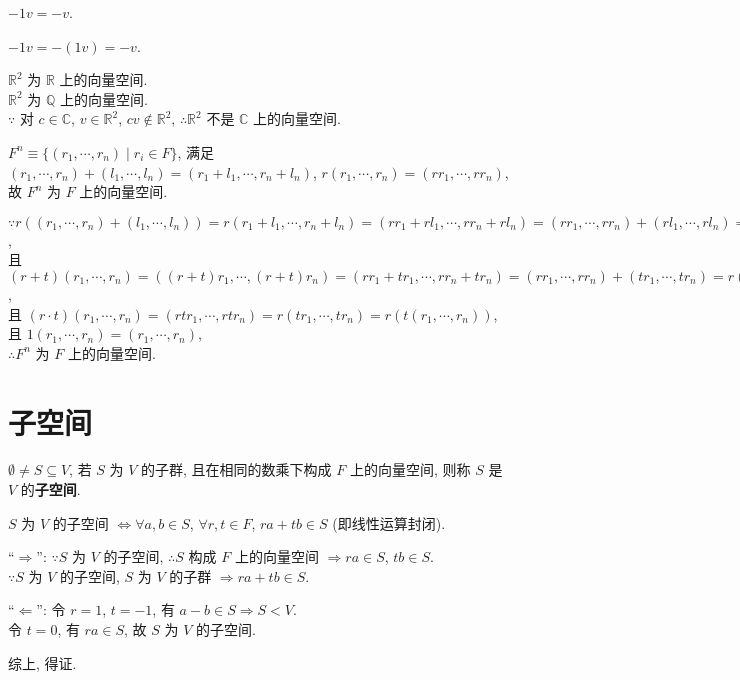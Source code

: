 \documentclass{note}
\begin{document}
$-1v=-v$.
\begin{pf}
    $-1v=-(1v)=-v$.
\end{pf}

\begin{eg}
    $\mathbb{R}^2$ 为 $\mathbb{R}$ 上的向量空间.\\
    $\mathbb{R}^2$ 为 $\mathbb{Q}$ 上的向量空间.\\
    $\because$ 对 $c\in\mathbb{C}$, $v\in\mathbb{R}^2$, $cv\notin\mathbb{R}^2$, $\therefore\mathbb{R}^2$ 不是 $\mathbb{C}$ 上的向量空间.
\end{eg}

\begin{eg}
    $F^n\equiv\{(r_1,\cdots,r_n)\mid r_i\in F\}$, 满足 $(r_1,\cdots,r_n)+(l_1,\cdots,l_n)=(r_1+l_1,\cdots,r_n+l_n)$, $r(r_1,\cdots,r_n)=(rr_1,\cdots,rr_n)$, 故 $F^n$ 为 $F$ 上的向量空间.
\end{eg}
\begin{pf}
    $\because r((r_1,\cdots,r_n)+(l_1,\cdots,l_n))=r(r_1+l_1,\cdots,r_n+l_n)=(rr_1+rl_1,\cdots,rr_n+rl_n)=(rr_1,\cdots,rr_n)+(rl_1,\cdots,rl_n)=r(r_1,\cdots,r_n)+r(l_1,\cdots,l_n)$,\\
    且 $(r+t)(r_1,\cdots,r_n)=((r+t)r_1,\cdots,(r+t)r_n)=(rr_1+tr_1,\cdots,rr_n+tr_n)=(rr_1,\cdots,rr_n)+(tr_1,\cdots,tr_n)=r(r_1,\cdots,r_n)+t(r_1,\cdots,r_n)$,\\
    且 $(r\cdot t)(r_1,\cdots,r_n)=(rtr_1,\cdots,rtr_n)=r(tr_1,\cdots,tr_n)=r(t(r_1,\cdots,r_n))$,\\
    且 $1(r_1,\cdots,r_n)=(r_1,\cdots,r_n)$,\\
    $\therefore F^n$ 为 $F$ 上的向量空间.
\end{pf}

\section{子空间}
\begin{df}[子空间]
    $\emptyset\neq S\subseteq V$, 若 $S$ 为 $V$ 的子群, 且在相同的数乘下构成 $F$ 上的向量空间, 则称 $S$ 是 $V$ 的\textbf{子空间}.
\end{df}

\begin{thm}
    $S$ 为 $V$ 的子空间 $\Longleftrightarrow\forall a,b\in S$, $\forall r,t\in F$, $ra+tb\in S$ (即线性运算封闭).
\end{thm}
\begin{pf}
    ``$\Longrightarrow$'': $\because S$ 为 $V$ 的子空间, $\therefore S$ 构成 $F$ 上的向量空间 $\Longrightarrow ra\in S$, $tb\in S$.\\
    $\because S$ 为 $V$ 的子空间, $S$ 为 $V$ 的子群 $\Longrightarrow ra+tb\in S$.

    ``$\Longleftarrow$'': 令 $r=1$, $t=-1$, 有 $a-b\in S\Longrightarrow S<V$.\\
    令 $t=0$, 有 $ra\in S$, 故 $S$ 为 $V$ 的子空间.

    综上, 得证.
\end{pf}
\end{document}

